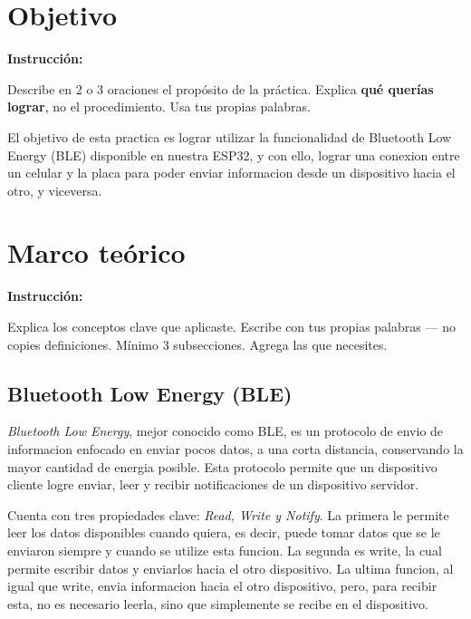 \documentclass[12pt, letterpaper]{article}
\newenvironment{instruccion}{%
  \begin{mdframed}[
    backgroundcolor = tealLight,
    linecolor       = tealMain,
    linewidth       = 1pt,
    innerleftmargin = 10pt, innerrightmargin = 10pt,
    innertopmargin  = 6pt,  innerbottommargin= 6pt
  ]
  \small\color{tealMain}\textbf{Instrucción:}\hspace{4pt}\color{black}
}{%
  \end{mdframed}
}
\begin{document}
\tableofcontents
\newpage


\section{Objetivo}

\begin{instruccion}
  Describe en 2 o 3 oraciones el propósito de la práctica. Explica
  \textbf{qué querías lograr}, no el procedimiento. Usa tus propias palabras.
\end{instruccion}

El objetivo de esta practica es lograr utilizar la funcionalidad de Bluetooth Low Energy (BLE) disponible en nuestra ESP32, y con ello, lograr una conexion entre un celular y la placa para poder enviar informacion desde un dispositivo hacia el otro, y viceversa.


\section{Marco teórico}

\begin{instruccion}
  Explica los conceptos clave que aplicaste. Escribe con tus propias palabras —
  no copies definiciones. Mínimo 3 subsecciones. Agrega las que necesites.
\end{instruccion}

\subsection{Bluetooth Low Energy (BLE)}

\emph{Bluetooth Low Energy}, mejor conocido como BLE, es un protocolo de envio de informacion enfocado en enviar pocos datos, a una corta distancia, conservando la mayor cantidad de energia posible. Esta protocolo permite que un dispositivo cliente logre enviar, leer y recibir notificaciones de un dispositivo servidor.

Cuenta con tres propiedades clave: \emph{Read, Write y Notify}. La primera le permite leer los datos disponibles cuando quiera, es decir, puede tomar datos que se le enviaron siempre y cuando se utilize esta funcion. La segunda es write, la cual permite escribir datos y enviarlos hacia el otro dispositivo. La ultima funcion, al igual que write, envia informacion hacia el otro dispositivo, pero, para recibir esta, no es necesario leerla, sino que simplemente se recibe en el dispositivo.
\end{document}
